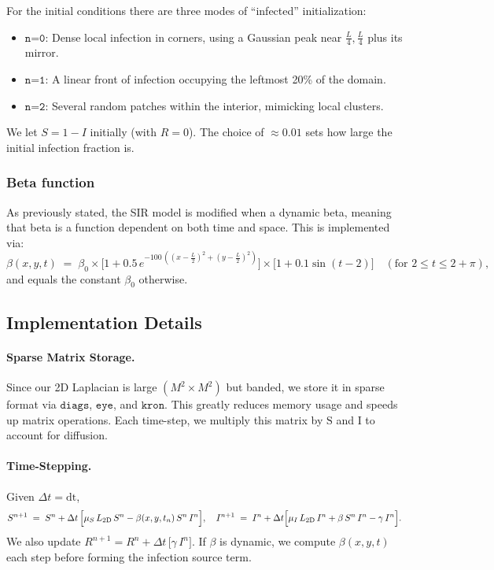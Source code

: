 For the initial conditions there are three modes of “infected” initialization:
\begin{itemize}
  \item \(\texttt{n=0}\): Dense local infection in corners, using a Gaussian peak near \(\tfrac{L}{4},\tfrac{L}{4}\) plus its mirror.
  \item \(\texttt{n=1}\): A linear front of infection occupying the leftmost 20\% of the domain.
  \item \(\texttt{n=2}\): Several random patches within the interior, mimicking local clusters.
\end{itemize}
We let \(S=1 - I\) initially (with \(R=0\)).  The choice of \( \approx 0.01\) sets how large the initial 
infection fraction is.

\subsubsection{Beta function}
As previously stated, the SIR model is modified when a dynamic beta, meaning that beta is a function dependent on 
both time and space. This is implemented via:
\[
  \beta(x,y,t) 
  \;=\; \beta_0 \times \bigl[1 + 0.5\,e^{-100\,((x-\tfrac{L}{2})^2 + (y-\tfrac{L}{2})^2)}\bigr]
  \times \bigl[1 + 0.1 \sin(t-2)\bigr]\quad (\text{for }2\le t \le 2+\pi),
\]
and equals the constant \(\beta_0\) otherwise.

\subsection{Implementation Details}

\paragraph{Sparse Matrix Storage.}
Since our 2D Laplacian is large \((M^2\times M^2)\) but banded, we store it in sparse format via 
\(\texttt{diags}\), \(\texttt{eye}\), and \(\texttt{kron}\). This greatly reduces memory usage and speeds up 
matrix operations.  Each time-step, we multiply this matrix by \(\mathrm{S}\) and \(\mathrm{I}\) to account for 
diffusion.

\paragraph{Time-Stepping.}
Given \(\Delta t=\text{dt}\),
\[
  S^{n+1} 
  \;=\;
  S^n + \Delta t\,\Bigl[\mu_S\,L_{\text{2D}}\,S^n - \beta(x,y,t_n)\,S^n\,I^n\Bigr],
  \quad
  I^{n+1}
  \;=\;
  I^n + \Delta t\Bigl[\mu_I\,L_{\text{2D}}\,I^n + \beta\,S^n\,I^n - \gamma\,I^n\Bigr].
\]
We also update 
\(
  R^{n+1} = R^n + \Delta t\,\bigl[\gamma\,I^n\bigr].
\)
If \(\beta\) is dynamic, we compute \(\beta(x,y,t)\) each step before forming the infection source term.


